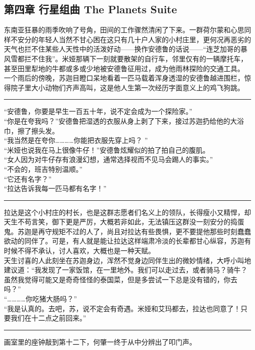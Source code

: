 \documentclass[oneside,11pt]{memoir} %
\begin{document}
\begin{CJK}{UTF8}{gbsn}
\chapter*{第四章      行星组曲      The Planets Suite}
   东南亚狂暴的雨季吹响了号角，田间的工作骤然清闲了下来。一群荷尔蒙和心思同样不安分的年轻人当然不甘心困在这只有几十户人家的小村庄里，更何况再恶劣的天气也拦不住某些人天性中的活泼好动——换作安德鲁的话说——“连芝加哥的暴风雪都拦不住我”。米娅那辆下一刻就要散架的自行车，邻里仅有的一辆摩托车，甚至田里犁地的牛都或多或少地被安德鲁征用过，成为他雨林探险的交通工具。\\\indent
   一个雨后的傍晚，苏迦目瞪口呆地看着一匹马载着浑身透湿的安德鲁越进围栏，惊得院子里大小动物们齐声高叫，这是他人生第一次经历字面意义上的鸡飞狗跳。\\\indent
\rule{-3pt}{30pt}
     “安德鲁，你要是早生一百五十年，说不定会成为一个探险家。”\\\indent
     “你是在夸我吗？”安德鲁把湿透的衣服从身上剥了下来，接过苏迦扔给他的大浴巾，擦了擦头发。\\\indent
     “我当然是在夸你…………你能把衣服先穿上吗？ ”\\\indent
     “米娅也说我在马上很像牛仔！”安德鲁炫耀似的拍了拍自己的腹肌。\\\indent
     “女人因为对牛仔存有浪漫幻想，通常选择视而不见马会踢人的事实。”\\\indent
     “不会的，班吉特别温顺。”\\\indent
     “它还有名字？”\\\indent
     “拉达告诉我每一匹马都有名字！”\\\indent
\rule{-3pt}{30pt}
   拉达是这个小村庄的村长，也是这群志愿者们名义上的领队，长得瘦小又精悍，却天生不苟言笑，御下更是严厉，大概若非如此，无法镇压这群没一刻安分的捣蛋鬼。苏迦是再守规矩不过的人了，尚且对拉达有些畏惧，更不要提他那些时刻蠢蠢欲动的同伴了。可是，有人就是能让拉达这样端肃冷淡的长辈都甘心纵容，苏迦有时候不得不承认，讨人喜欢，大概也是一种天赋。\\\indent
   天生讨喜的人此刻坐在苏迦身边，浑然不觉身边同伴生出的微妙情绪，大呼小叫地建议道：“我发现了一家饭馆，在一里地外。我们可以走过去，或者骑马？骑牛？虽然我觉得可能又是奇奇怪怪的泰国菜，但是多尝试一下总是没有错的，你去吗？”\\\indent
     “…………你吃猪大肠吗？”\\\indent
     “我是认真的。去吧，苏，说不定会有奇遇。米娅和艾玛都去，拉达也同意了！只要我们在十二点之前回来。”\\\indent
\rule{-3pt}{30pt}
     画室里的座钟敲到第十二下，何肇一终于从中分辨出了叩门声。\\\indent

\end{CJK}
\end{document}
